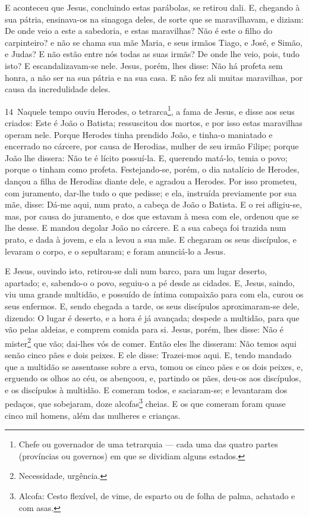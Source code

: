 E aconteceu que Jesus, concluindo estas parábolas, se retirou
dali. E, chegando à sua pátria, ensinava-os na sinagoga
deles, de sorte que se maravilhavam, e diziam: De onde veio a este a
sabedoria, e estas maravilhas? Não é este o filho do
carpinteiro? e não se chama sua mãe Maria, e seus irmãos Tiago, e
José, e Simão, e Judas? E não estão entre nós todas as suas
irmãs? De onde lhe veio, pois, tudo isto? E escandalizavam-se
nele. Jesus, porém, lhes disse: Não há profeta sem honra, a não ser
na sua pátria e na sua casa. E não fez ali muitas maravilhas,
por causa da incredulidade deles.

\medskip

\lettrine{14}\ Naquele tempo ouviu Herodes, o
tetrarca\footnote{Chefe ou governador de uma tetrarquia --- cada uma
das quatro partes (províncias ou governos) em que se dividiam alguns
estados.}, a fama de Jesus, e disse aos seus criados: Este é
João o Batista; ressuscitou dos mortos, e por isso estas maravilhas
operam nele. Porque Herodes tinha prendido João, e tinha-o
maniatado e encerrado no cárcere, por causa de Herodias, mulher de
seu irmão Filipe; porque João lhe dissera: Não te é lícito
possuí-la. E, querendo matá-lo, temia o povo; porque o tinham
como profeta. Festejando-se, porém, o dia natalício de Herodes,
dançou a filha de Herodias diante dele, e agradou a Herodes. Por
isso prometeu, com juramento, dar-lhe tudo o que pedisse; e ela,
instruída previamente por sua mãe, disse: Dá-me aqui, num prato, a
cabeça de João o Batista. E o rei afligiu-se, mas, por causa do
juramento, e dos que estavam à mesa com ele, ordenou que se lhe
desse. E mandou degolar João no cárcere. E a sua
cabeça foi trazida num prato, e dada à jovem, e ela a levou a sua
mãe. E chegaram os seus discípulos, e levaram o corpo, e o
sepultaram; e foram anunciá-lo a Jesus.

E Jesus, ouvindo isto, retirou-se dali num barco, para um lugar
deserto, apartado; e, sa\-ben\-do-o o povo, seguiu-o a pé desde as
cidades. E, Jesus, saindo, viu uma grande multidão, e
possuído de íntima compaixão para com ela, curou os seus enfermos.
E, sendo chegada a tarde, os seus discípulos aproximaram-se
dele, dizendo: O lugar é deserto, e a hora é já avançada; despede a
multidão, para que vão pelas aldeias, e comprem comida para si.
Jesus, porém, lhes disse: Não é mister\footnote{Necessidade,
urgência.} que vão; dai-lhes vós de comer. Então eles lhe
disseram: Não temos aqui senão cinco pães e dois peixes. E
ele disse: Trazei-mos aqui. E, tendo mandado que a multidão
se assentasse sobre a erva, tomou os cinco pães e os dois peixes, e,
erguendo os olhos ao céu, os abençoou, e, partindo os pães, deu-os
aos discípulos, e os discípulos à multidão. E comeram todos,
e saciaram-se; e levantaram dos pedaços, que sobejaram, doze
alcofas\footnote{Alcofa: Cesto flexível, de vime, de esparto ou de
folha de palma, achatado e com asas.} cheias. E os que
comeram foram quase cinco mil homens, além das mulheres e crianças.

